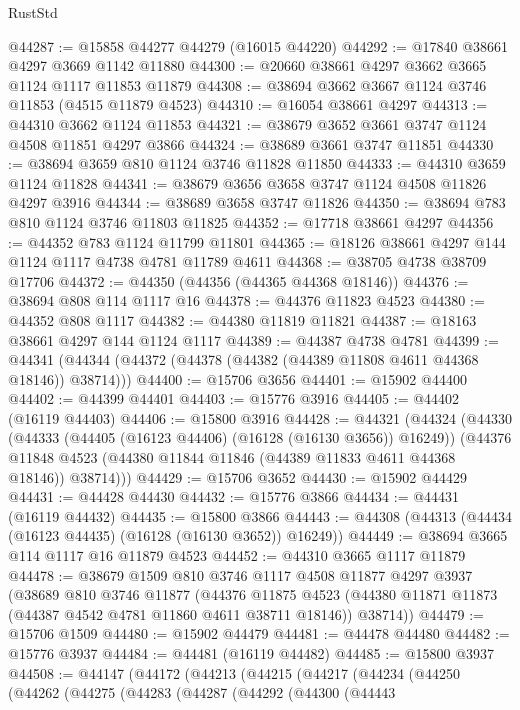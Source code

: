 \begin{lexlean}{RustStd}
\begin{coremodule}
@44287 := @15858 @44277 @44279 (@16015 @44220)
@44292 := @17840 @38661 @4297 @3669 @1142 @11880
@44300 := @20660 @38661 @4297 @3662 @3665 @1124 @1117 @11853 @11879
@44308 := @38694 @3662 @3667 @1124 @3746 @11853 (@4515 @11879 @4523)
@44310 := @16054 @38661 @4297
@44313 := @44310 @3662 @1124 @11853
@44321 := @38679 @3652 @3661 @3747 @1124 @4508 @11851 @4297 @3866
@44324 := @38689 @3661 @3747 @11851
@44330 := @38694 @3659 @810 @1124 @3746 @11828 @11850
@44333 := @44310 @3659 @1124 @11828
@44341 := @38679 @3656 @3658 @3747 @1124 @4508 @11826 @4297 @3916
@44344 := @38689 @3658 @3747 @11826
@44350 := @38694 @783 @810 @1124 @3746 @11803 @11825
@44352 := @17718 @38661 @4297
@44356 := @44352 @783 @1124 @11799 @11801
@44365 := @18126 @38661 @4297 @144 @1124 @1117 @4738 @4781 @11789 @4611
@44368 := @38705 @4738 @38709 @17706
@44372 := @44350 (@44356 (@44365 @44368 @18146))
@44376 := @38694 @808 @114 @1117 @16
@44378 := @44376 @11823 @4523
@44380 := @44352 @808 @1117
@44382 := @44380 @11819 @11821
@44387 := @18163 @38661 @4297 @144 @1124 @1117
@44389 := @44387 @4738 @4781
@44399 := @44341 (@44344 (@44372 (@44378 (@44382 (@44389 @11808 @4611 @44368 @18146)) @38714)))
@44400 := @15706 @3656
@44401 := @15902 @44400
@44402 := @44399 @44401
@44403 := @15776 @3916
@44405 := @44402 (@16119 @44403)
@44406 := @15800 @3916
@44428 := @44321
    (@44324
      (@44330
        (@44333 (@44405 (@16123 @44406) (@16128 (@16130 @3656)) @16249))
        (@44376 @11848 @4523 (@44380 @11844 @11846 (@44389 @11833 @4611 @44368 @18146)) @38714)))
@44429 := @15706 @3652
@44430 := @15902 @44429
@44431 := @44428 @44430
@44432 := @15776 @3866
@44434 := @44431 (@16119 @44432)
@44435 := @15800 @3866
@44443 := @44308 (@44313 (@44434 (@16123 @44435) (@16128 (@16130 @3652)) @16249))
@44449 := @38694 @3665 @114 @1117 @16 @11879 @4523
@44452 := @44310 @3665 @1117 @11879
@44478 := @38679
    @1509
    @810
    @3746
    @1117
    @4508
    @11877
    @4297
    @3937
    (@38689
      @810
      @3746
      @11877
      (@44376
        @11875
        @4523
        (@44380 @11871 @11873 (@44387 @4542 @4781 @11860 @4611 @38711 @18146))
        @38714))
@44479 := @15706 @1509
@44480 := @15902 @44479
@44481 := @44478 @44480
@44482 := @15776 @3937
@44484 := @44481 (@16119 @44482)
@44485 := @15800 @3937
@44508 := @44147
    (@44172
      (@44213
        (@44215
          (@44217
            (@44234
              (@44250
                (@44262
                  (@44275
                    (@44283
                      (@44287
                        (@44292
                          (@44300
                            (@44443

\end{coremodule}
\end{lexlean}
